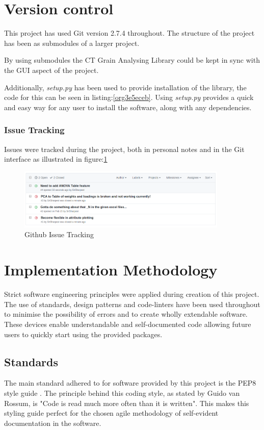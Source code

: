 \documentclass[11pt]{report}
\begin{document}
\section{Version control}
\label{sec:org1104402}
This project has used Git version 2.7.4 throughout. The structure of the project has been as submodules of a larger project.

By using submodules the CT Grain Analysing Library could be kept in sync with the GUI aspect of the project.

Additionally, \emph{setup.py} has been used to provide installation of the library, the code for this can be seen in listing:\ref{org3e5eceb}. Using \emph{setup.py} provides a quick and easy way for any user to install the software, along with any dependencies.

\subsubsection{Issue Tracking}
\label{sec:org7a91230}
Issues were tracked during the project, both in personal notes and in the Git interface as illustrated in figure:\ref{fig:org358b861}
\begin{figure}[htbp]
\centering
\includegraphics[width=10cm]{./images/github.png}
\caption{\label{fig:org358b861}
Github Issue Tracking}
\end{figure}

\section{Implementation Methodology}
\label{sec:orge521605}
Strict software engineering principles were applied during creation of this project. The use of standards, design patterns and code-linters have been used throughout to minimise the possibility of errors and to create wholly extendable software. These devices enable understandable and self-documented code allowing future users to quickly start using the provided packages.
\subsection{Standards}
\label{sec:org2103ce5}
The main standard adhered to for software provided by this project is the PEP8 style guide \cite{VanRossum}. The principle behind this coding style, as stated by Guido van Rossum, is "Code is read much more often than it is written". This makes this styling guide perfect for the chosen agile methodology of self-evident documentation in the software.
\end{document}
